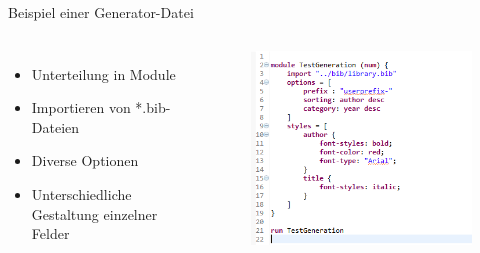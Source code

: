 \documentclass[fleqn,11pt,aspectratio=43]{beamer}
\begin{document}
\begin{frame}[t]{Beispiel einer Generator-Datei}
\begin{columns} 
\begin{itemize}
\item Unterteilung in Module
\item Importieren von *.bib-Dateien
\item Diverse Optionen 
\item Unterschiedliche Gestaltung einzelner Felder
\end{itemize}
\begin{figure}[th]
\includegraphics[scale=0.6]{../ExampleHTMLGEN.png} 
\end{figure}
\end{columns}
   
\end{frame}
\end{document}
